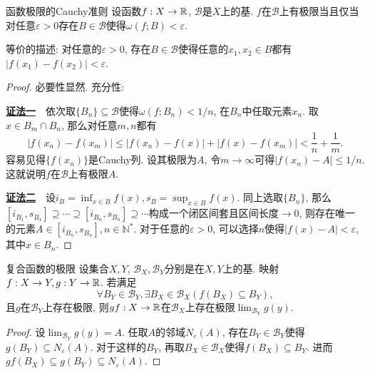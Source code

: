 \begin{theorem}{函数极限的Cauchy准则} \label{pro:hjuucauchy}
	设函数$f:X \to \mathbb{R}$, $\mathcal{B}$是$X$上的基. $f$在$\mathcal{B}$上有极限当且仅当对任意$\varepsilon >0$存在$B \in \mathcal{B}$使得$\omega (f;B) < \varepsilon$. 
\end{theorem}
\begin{remark}
	等价的描述: 对任意的$\varepsilon > 0$, 存在$B \in \mathcal{B}$使得任意的$x_1,x_2 \in B$都有$|f(x_1)-f(x_2)|<\varepsilon$. 
\end{remark}
\begin{proof}
	必要性显然. 充分性: 
	
	\underline{\textbf{证法一}}~~依次取$\{ B_n \} \subseteq \mathcal{B}$使得$\omega (f;B_n)<1/n$, 在$B_n$中任取元素$x_n$. 取$x \in B_m \cap B_n$, 那么对任意$m,n$都有$$|f(x_n)-f(x_m)| \leq |f(x_n)-f(x)| + |f(x)-f(x_m)| < \frac{1}{n} + \frac{1}{m}. $$
	容易见得$\{ f(x_n) \}$是Cauchy列. 设其极限为$A$, 令$m\to \infty$可得$|f(x_n)-A| \leq 1/n$. 这就说明$f$在$\mathcal{B}$上有极限$A$. 
	
	\underline{\textbf{证法二}}~~设$i_B = \inf_{x \in B}f(x), s_B = \sup_{x \in B}f(x)$. 同上选取$\{ B_n \}$, 那么$[i_{B_1},s_{B_1}] \supseteq \cdots \supseteq [i_{B_n},s_{B_n}] \supseteq \cdots$构成一个闭区间套且区间长度$\to 0$, 则存在唯一的元素$A \in [i_{B_n},s_{B_n}], n\in \mathbb{N}^*$. 对于任意的$\varepsilon >0$, 可以选择$n$使得$|f(x)-A|<\varepsilon$, 其中$x \in B_n$. 
\end{proof}

\begin{theorem}{复合函数的极限}
	设集合$X,Y$, $\mathcal{B}_X, \mathcal{B}_Y$分别是在$X,Y$上的基. 映射$f:X \to Y, g:Y \to \mathbb{R}$. 若满足
	\begin{equation}
		\forall B_Y \in \mathcal{B}_Y, \exists B_X \in \mathcal{B}_X (f(B_X) \subseteq B_Y),\label{fuhehjuudejixm}
	\end{equation}
	且$g$在$\mathcal{B}_Y$上存在极限, 则$gf:X \to \mathbb{R}$在$\mathcal{B}_X$上存在极限$\lim_{\mathcal{B}_Y} g(y)$. 
\end{theorem}
\begin{proof}
	设$\lim_{\mathcal{B}_Y} g(y)=A$. 任取$A$的邻域$N_{\varepsilon} (A)$, 存在$B_Y \in \mathcal{B}_Y$使得$g(B_Y) \subseteq N_{\varepsilon} (A)$. 对于这样的$B_Y$, 再取$B_X \in \mathcal{B}_X$使得$f(B_X) \subseteq B_Y$. 进而$gf(B_X) \subseteq g(B_Y) \subseteq N_{\varepsilon} (A)$. 
\end{proof}

